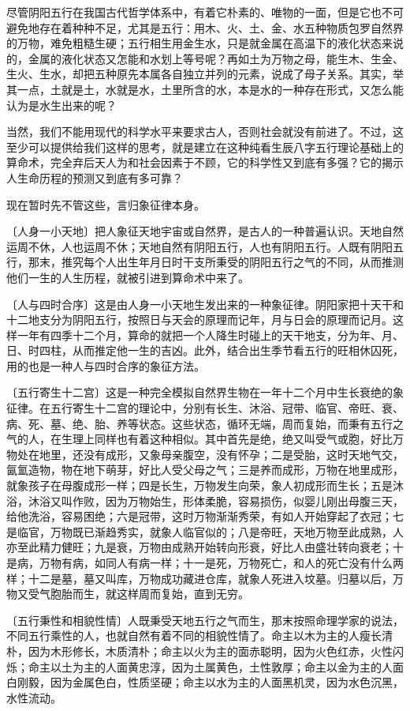 \documentclass[a5paper,oneside,12pt]{ctexbook}
\begin{document}
{{尽管阴阳五行在我国古代哲学体系中，有着它朴素的、唯物的一面，但是它也不可避免地存在着种种不足，尤其是五行：用木、火、土、金、水五种物质包罗自然界的万物，难免粗糙生硬；五行相生用金生水，只是就金属在高温下的液化状态来说的，金属的液化状态又怎能和水划上等号呢？再如土为万物之母，能生木、生金、生火、生水，却把五种原先本属各自独立并列的元素，说成了母子关系。其实，举其一点，土就是土，水就是水，土里所含的水，本是水的一种存在形式，又怎么能认为是水生出来的呢？

当然，我们不能用现代的科学水平来要求古人，否则社会就没有前进了。不过，这至少可以提供给我们这样的思考，就是建立在这种纯看生辰八字五行理论基础上的算命术，完全弃后天人为和社会因素于不顾，它的科学性又到底有多强？它的揭示人生命历程的预测又到底有多可靠？

现在暂时先不管这些，言归象征律本身。

〔人身一小天地〕把人象征天地宇宙或自然界，是古人的一种普遍认识。天地自然运周不休，人也运周不休；天地自然有阴阳五行，人也有阴阳五行。人既有阴阳五行，那末，推究每个人出生年月日时干支所秉受的阴阳五行之气的不同，从而推测他们一生的人生历程，就被引进到算命术中来了。

〔人与四时合序〕这是由人身一小天地生发出来的一种象征律。阴阳家把十天干和十二地支分为阴阳五行，按照日与天会的原理而记年，月与日会的原理而记月。这样一年有四季十二个月，算命的就把一个人降生时碰上的天干地支，分为年、月、日、时四柱，从而推定他一生的吉凶。此外，结合出生季节看五行的旺相休囚死，用的也是一种人与四时合序的象征方法。

〔五行寄生十二宫〕这是一种完全模拟自然界生物在一年十二个月中生长衰绝的象征律。在五行寄生十二宫的理论中，分别有长生、沐浴、冠带、临官、帝旺、衰、病、死、墓、绝、胎、养等状态。这些状态，循环无端，周而复始，而秉有五行之气的人，在生理上同样也有着这种相似。其中首先是绝，绝又叫受气或胞，好比万物处在地里，还没有成形，又象母亲腹空，没有怀孕；二是受胎，这时天地气交，氤氳造物，物在地下萌芽，好比人受父母之气；三是养而成形，万物在地里成形，就象孩子在母腹成形一样；四是长生，万物发生向荣，象人初成形而生长；五是沐浴，沐浴又叫作败，因为万物始生，形体柔脆，容易损伤，似婴儿刚出母腹三天，给他洗浴，容易困绝；六是冠带，这时万物渐渐秀荣，有如人开始穿起了衣冠；七是临官，万物既已渐趋秀实，就象人临官似的；八是帝旺，天地万物至此成熟，人亦至此精力健旺；九是衰，万物由成熟开始转向形衰，好比人由盛壮转向衰老；十是病，万物有病，如同人有病一样；十一是死，万物死亡，和人的死亡没有什么两样；十二是墓，墓又叫库，万物成功藏进仓库，就象人死进入坟墓。归墓以后，万物又受气胞胎而生，就这样周而复始，直到无穷。

〔五行秉性和相貌性情〕人既秉受天地五行之气而生，那末按照命理学家的说法，不同五行乘性的人，也就自然有着不同的相貌性情了。命主以木为主的人瘦长清朴，因为木形修长，木质清朴；命主以火为主的面赤聪明，因为火色红赤，火性闪烁；命主以土为主的人面黄忠淳，因为土属黄色，土性敦厚；命主以金为主的人面白刚毅，因为金属色白，性质坚硬；命主以水为主的人面黑机灵，因为水色沉黑，水性流动。

}}
\end{document}
